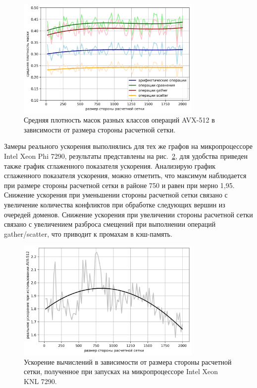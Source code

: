 \begin{figure}[ht]
\centering
\includegraphics[width=0.8\textwidth]{pics/text_4_vec_integer/chart_statistics_rus.png}
\caption{Средняя плотность масок разных классов операций AVX-512 в зависимости от размера стороны расчетной сетки.}
\label{fig:text_4_vec_integer_stat}
\end{figure}

Замеры реального ускорения выполнялись для тех же графов на микропроцессоре Intel Xeon Phi 7290, результаты представлены на рис.~\ref{fig:text_4_vec_integer_sp}, для удобства приведен также график сглаженного показателя ускорения.
Анализирую график сглаженного показателя ускорения, можно отметить, что максимум наблюдается при размере стороны расчетной сетки в районе 750 и равен при мерно 1,95.
Снижение ускорения при уменьшении стороны расчетной сетки связано с увеличение количества конфликтов при обработке следующих вершин из очередей доменов.
Снижение ускорения при увеличении стороны расчетной сетки связано с увеличением разброса смещений при выполнении операций gather/scatter, что приводит к промахам в кэш-память.

\begin{figure}[ht]
\centering
\includegraphics[width=0.8\textwidth]{pics/text_4_vec_integer/chart_speedup_rus.png}
\caption{Ускорение вычислений в зависимости от размера стороны расчетной сетки, полученное при запусках на микропроцессоре Intel Xeon KNL 7290.}
\label{fig:text_4_vec_integer_sp}
\end{figure}

